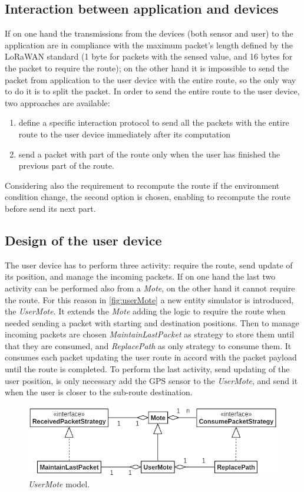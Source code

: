 \subsection*{Interaction between application and devices}
If on one hand the transmissions from the devices (both sensor and user) to the application are in compliance with the maximum packet's length defined by the LoRaWAN standard (1 byte for packets with the sensed value, and 16 bytes for the packet to require the route); on the other hand it is impossible to send the packet from application to the user device with the entire route, so the only way to do it is to split the packet.
In order to send the entire route to the user device, two approaches are available: 
\begin{enumerate}
    \item define a specific interaction protocol to send all the packets with the entire route to the user device immediately after its computation
    \item send a packet with part of the route only when the user has finished the previous part of the route.
\end{enumerate}
Considering also the requirement to recompute the route if the environment condition change, the second option is chosen, enabling to recompute the route before send its next part.

\subsection*{Design of the user device}
The user device has to perform three activity: require the route, send update of its position, and manage the incoming packets.
If on one hand the last two activity can be performed also from a \textit{Mote}, on the other hand it cannot require the route.
For this reason in \autoref{fig:userMote} a new entity simulator is introduced, the \textit{UserMote}. 
It extends the \textit{Mote} adding the logic to require the route when needed sending a packet with starting and destination positions.
Then to manage incoming packets are chosen \textit{MaintainLastPacket} as strategy to store them until that they are consumed, and \textit{ReplacePath} as only strategy to consume them.
It consumes each packet updating the user route in accord with the packet payload until the route is completed.
To perform the last activity, send updating of the user position, is only necessary add the GPS sensor to the \textit{UserMote}, and send it when the user is closer to the sub-route destination.
% 
\begin{figure}[h]
    \centering
    \includegraphics{figures/userMote.png}
    \caption{\textit{UserMote} model.}
    \label{fig:userMote}
\end{figure}
% 

